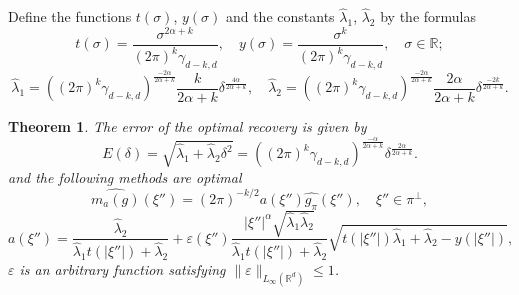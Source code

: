 \documentclass[12pt]{iopart}
\newtheorem{theorem}{Theorem}
\begin{document}
Define the functions $t(\sigma)$, $y(\sigma)$ and the constants $\widehat\lambda_1$, $\widehat\lambda_2$ by the formulas
  \begin{equation}
  \label{xy}
  t(\sigma)=\frac{\sigma^{2\alpha+k}}{(2\pi)^{k}\gamma_{d-k,d}},\quad
  y(\sigma)=\frac{\sigma^k}{(2\pi)^{k}\gamma_{d-k,d}},\quad \sigma\in\mathbb R;
  \end{equation}
  \begin{equation}
    \label{lambda}
    \widehat\lambda_1=((2\pi)^k\gamma_{d-k,d})^{\frac{-2\alpha}{2\alpha+k}}\frac{k}{2\alpha+k}\delta^\frac{4\alpha}{2\alpha+k},\quad \widehat\lambda_2=((2\pi)^k\gamma_{d-k,d})^{\frac{-2\alpha}{2\alpha+k}}\frac{2\alpha}{2\alpha+k}\delta^\frac{-2k}{2\alpha+k}. 
  \end{equation}

\begin{theorem}
\label{theorem}
The error of the optimal recovery is given by
  \[
E(\delta)=\sqrt{\widehat\lambda_1+\widehat\lambda_2\delta^2}=((2\pi)^k\gamma_{d-k,d})^{\frac{-\alpha}{2\alpha+k}}\delta^{\frac{2\alpha}{2\alpha+k}}.
\]
and the following methods are optimal
 \begin{equation}
\label{method}
  \widehat{m_a(g)}(\xi'')=(2\pi)^{-k/2}a(\xi'')\widehat{g_\pi }(\xi''),\quad \xi''\in\pi^\perp,
\end{equation}
  \begin{equation}
  \label{a}
  a(\xi'')=\frac{\widehat\lambda_2}{\widehat\lambda_1t(|\xi''|)+\widehat\lambda_2}+\varepsilon(\xi'')\frac{|\xi''|^\alpha\sqrt{\widehat\lambda_1\widehat\lambda_2}}{\widehat\lambda_1t(|\xi''|)+\widehat\lambda_2}\sqrt{t(|\xi''|)\widehat\lambda_1+\widehat\lambda_2-y(|\xi''|)},
  \end{equation}
  $\varepsilon$ is an arbitrary function satisfying $\|\varepsilon\|_{L_\infty(\mathbb R^d)}\le 1$.
\end{theorem}
\end{document}
